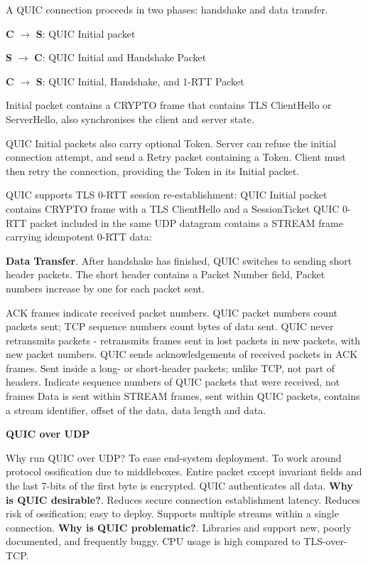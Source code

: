 \documentclass{article}
\begin{document}
A QUIC connection proceeds in two phases: handshake and data transfer.

\textbf{C} $\rightarrow$ \textbf{S}: QUIC Initial packet

\textbf{S} $\rightarrow$ \textbf{C}: QUIC Initial and Handshake Packet

\textbf{C} $\rightarrow$ \textbf{S}: QUIC Initial, Handshake, and 1-RTT Packet

Initial packet contains a CRYPTO frame that contains TLS ClientHello or ServerHello, also synchronises the client and server state.

QUIC Initial packets also carry optional Token.
Server can refuse the initial connection attempt, and send a Retry packet containing a Token.
Client must then retry the connection, providing the Token in its Initial packet.

QUIC supports TLS 0-RTT session re-establishment: QUIC Initial packet contains CRYPTO frame with a TLS ClientHello
and a SessionTicket QUIC 0-RTT packet included in the same UDP datagram contains a STREAM frame carrying idempotent 0-RTT data:


\textbf{Data Transfer}. After handshake has finished, QUIC switches to sending short header packets.
The short header contains a Packet Number field, Packet numbers increase by one for each packet sent.

ACK frames indicate received packet numbers. QUIC packet numbers count packets sent; TCP sequence numbers count bytes of data sent.
QUIC never retransmits packets {-} retransmits frames sent in lost packets in new packets, with new packet numbers.
QUIC sends acknowledgements of received packets in ACK frames.
Sent inside a long- or short-header packets; unlike TCP, not part of headers.
Indicate sequence numbers of QUIC packets that were received, not frames
Data is sent within STREAM frames, sent within QUIC packets, contains a stream identifier, offset of the data, data length and data.

\vspace{\baselineskip}
\textbf{QUIC over UDP}

Why run QUIC over UDP\@? To ease end-system deployment.
To work around protocol ossification due to middleboxes.
Entire packet except invariant fields and the last 7-bits of the first byte is encrypted.
QUIC authenticates all data.
\textbf{Why is QUIC desirable?}.
Reduces secure connection establishment latency.
Reduces risk of ossification; easy to deploy.
Supports multiple streams within a single connection.
\textbf{Why is QUIC problematic?}.
Libraries and support new, poorly documented, and frequently buggy.
CPU usage is high compared to TLS-over-TCP\@.
\end{document}
